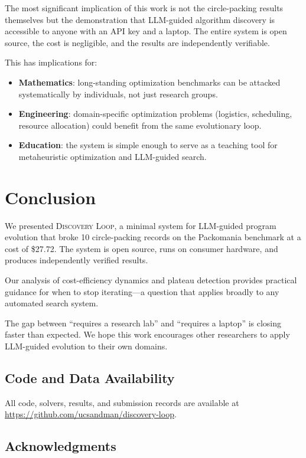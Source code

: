 \documentclass[11pt]{article}
\begin{document}
The most significant implication of this work is not the circle-packing results themselves
but the demonstration that LLM-guided algorithm discovery is accessible to anyone with an
API key and a laptop. The entire system is open source, the cost is negligible, and the
results are independently verifiable.

This has implications for:
\begin{itemize}
  \item \textbf{Mathematics}: long-standing optimization benchmarks can be attacked
        systematically by individuals, not just research groups.
  \item \textbf{Engineering}: domain-specific optimization problems (logistics, scheduling,
        resource allocation) could benefit from the same evolutionary loop.
  \item \textbf{Education}: the system is simple enough to serve as a teaching tool for
        metaheuristic optimization and LLM-guided search.
\end{itemize}

\section{Conclusion}

We presented \textsc{Discovery Loop}, a minimal system for LLM-guided program evolution that
broke 10 circle-packing records on the Packomania benchmark at a cost of \$27.72. The system
is open source, runs on consumer hardware, and produces independently verified results.

Our analysis of cost-efficiency dynamics and plateau detection provides practical guidance for
when to stop iterating---a question that applies broadly to any automated search system.

The gap between ``requires a research lab'' and ``requires a laptop'' is closing faster than
expected. We hope this work encourages other researchers to apply LLM-guided evolution to
their own domains.

\subsection*{Code and Data Availability}

All code, solvers, results, and submission records are available at
\url{https://github.com/ucsandman/discovery-loop}.

\subsection*{Acknowledgments}
\end{document}
